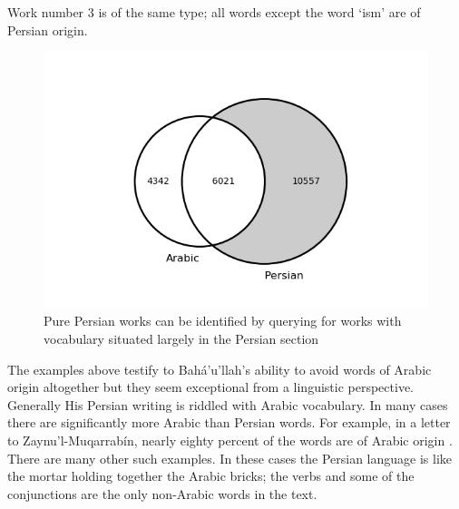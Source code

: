 \documentclass[12pt, oneside]{report}
\begin{document}
Work number 3 is of the same type; all words except the word `ism' are of Persian origin.
\begin{figure}
	\centering\captionsetup[subfigure]{justification=centering}
	\includegraphics[width=\linewidth]{figures/venn-persian.png}
	\caption[Venn diagram with Persian section highlighted]{Pure Persian works can be identified by querying for works with vocabulary situated largely in the Persian section}\label{fig:venn-pers}
\end{figure}
\par
The examples above testify to Bah\'{a}'u'llah's ability to avoid words of Arabic origin altogether but they seem exceptional from a linguistic perspective.
Generally His Persian writing is riddled with Arabic vocabulary.
In many cases there are significantly more Arabic than Persian words.
For example, in a letter to Zaynu'l-Muqarrab\'{i}n, nearly eighty percent of the words are of Arabic origin \cite{bahaullah_muntakhabati-az_163}.
There are many other such examples.
In these cases the Persian language is like the mortar holding together the Arabic bricks; the verbs and some of the conjunctions are the only non-Arabic words in the text.
\end{document}
